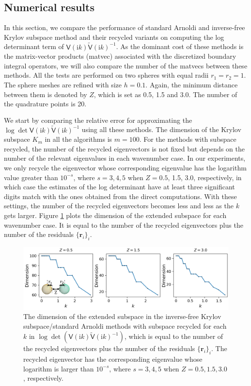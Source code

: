 \subsection{Numerical results}
In this section, we compare the performance of standard Arnoldi and inverse-free Krylov subspace method and their recycled variants on computing the log 
determinant term of $\mathsf{V}(\mathrm{i}k)\tilde{\mathsf{V}}(\mathrm{i}k)^{-1}$. As the dominant cost of these methods is the matrix-vector products (matvec) 
associated with the discretized boundary integral operators, 
we will also compare the number of the matvecs between these methods. All the tests are performed on two spheres with equal radii $r_1 = r_2 = 1$. 
The sphere meshes are refined with size $h = 0.1$. Again, the minimum distance between them is denoted by $Z$, which is set as 0.5, 1.5 and 3.0. 
The number of the quadrature points is 20.

We start by comparing the relative error for approximating the $\log\det\mathsf{V}(\mathrm{i}k)\tilde{\mathsf{V}}(\mathrm{i}k)^{-1}$ using all these methods. 
The dimension of the Krylov subspace $K_m$ in all the algorithms is $m = 100$. 
For the methods with subspace recycled, the number of the recycled eigenvectors is not fixed but depends on the number of the relevant eigenvalues in each wavenumber case. 
In our experiments, we only recycle the eigenvector whose corresponding eigenvalue has the logarithm value greater than $10^{-s}$, where $s = 3, 4, 5$ when $Z = 0.5$, 1.5, 3.0, respectively, in which case the estimates of the log determinant have at least three significant digits match with the ones obtained from the direct computations. With these settings, the number of the recycled
eigenvectors becomes less and less as the $k$ gets larger.  Figure \ref{Dimension_of_the_extended_subspace} plots the dimension of the extended subspace
for each wavenumber case. It is equal to the number of the recycled eigenvectors plus the number of the residuals $\{\mathbf{r}_{i}\}_{i}$.


\begin{figure}[H]
    \centering
    \includegraphics[width = \textwidth]{figures/Dimension_of_the_extended_subspace.png}
    \caption{The dimension of the extended subspace in the inverse-free Krylov subspace/standard Arnoldi methods with subspace recycled for each $k$ in $\log\det(\mathsf{V}(\mathrm{i}k)\tilde{\mathsf{V}}(\mathrm{i}k)^{-1})$, which is equal to the number of the recycled 
    eigenvectors plus the number of the residuals $\{\mathbf{r}_{i}\}_{i}$. The recycled eigenvector has the corresponding eigenvalue whose logarithm
    is larger than $10^{-s}$, where $s = 3, 4, 5$ when $Z = 0.5, 1.5, 3.0$, respectively.}
    \label{Dimension_of_the_extended_subspace}
\end{figure}


